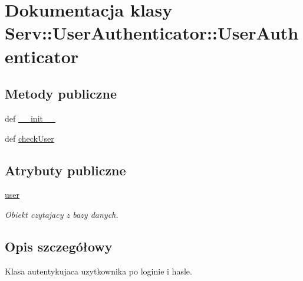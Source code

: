 \hypertarget{class_serv_1_1_user_authenticator_1_1_user_authenticator}{
\section{Dokumentacja klasy Serv::UserAuthenticator::UserAuthenticator}
\label{class_serv_1_1_user_authenticator_1_1_user_authenticator}
}
\subsection*{Metody publiczne}
\begin{DoxyCompactItemize}
\item 
def \hyperlink{class_serv_1_1_user_authenticator_1_1_user_authenticator_a8da26a197368b560fc5b51a56cf95ccf}{\_\-\_\-init\_\-\_\-}
\item 
def \hyperlink{class_serv_1_1_user_authenticator_1_1_user_authenticator_adf35019818eb86047a9c8d1d415bf3e5}{checkUser}
\end{DoxyCompactItemize}
\subsection*{Atrybuty publiczne}
\begin{DoxyCompactItemize}
\item 
\hypertarget{class_serv_1_1_user_authenticator_1_1_user_authenticator_a6f0f3992518647fc45cf548f9c5a79e8}{
\hyperlink{class_serv_1_1_user_authenticator_1_1_user_authenticator_a6f0f3992518647fc45cf548f9c5a79e8}{user}}
\label{class_serv_1_1_user_authenticator_1_1_user_authenticator_a6f0f3992518647fc45cf548f9c5a79e8}

\begin{DoxyCompactList}\small\item\em Obiekt czytajacy z bazy danych. \item\end{DoxyCompactList}\end{DoxyCompactItemize}


\subsection{Opis szczegółowy}
\begin{DoxyVerb}Klasa autentykujaca uzytkownika po loginie i hasle.\end{DoxyVerb}
 

